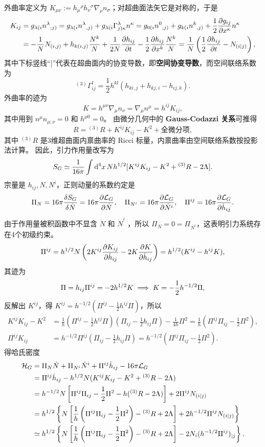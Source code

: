 外曲率定义为 $K_{\mu\nu}:=h_\mu{}^\rho h_\nu{}^\sigma\nabla_\rho n_\sigma$；对超曲面法矢它是对称的，于是
\begin{align*}
K_{ij} &= g_{\lambda(i}{n^{\lambda}}_{;j)} = g_{\lambda(i}{n^{\lambda}}_{,j)} + g_{\lambda(i}\Gamma_{j)\kappa}^{\lambda}n^{\kappa} = g_{0(i}{n^{0}}_{,j)} + g_{k(i}{n^{k}}_{,j)} + \frac{1}{2}\pdv{g_{ij}}{x^{\kappa}}n^{\kappa} \\
&= -\frac{1}{N}N_{(i,j)} + h_{k(i,j)}\frac{N^{k}}{N} + \frac{1}{2N}\pdv{h_{ij}}{t} - \frac{1}{2}\pdv{h_{ij}}{x^{k}}\frac{N^{k}}{N} = \frac{1}{N}\left(\frac{1}{2}\pdv{h_{ij}}{t} - N_{(i|j)}\right),
\end{align*}
其中下标竖线“|”代表在超曲面内的协变导数，即\textbf{空间协变导数}，而空间联络系数为
\[ ^{(3)}\Gamma_{ij}^{l} = \frac{1}{2}h^{kl}(h_{ki,j}+h_{kj,i}-h_{ij,k}). \]
外曲率的迹为
\[ K=h^{\mu\nu}\nabla_\mu n_\nu=\nabla_\mu n^\mu=h^{ij}K_{ij}, \]
其中用到 $n^{\mu}n_{\mu;\nu}=0$ 和 $h^{\mu0}=0$。
由微分几何中的 \textbf{Gauss-Codazzi 关系}可推得
\[ R = {}^{(3)}R + K^{ij}K_{ij} - K^{2} + \text{全微分项}, \]
其中 $^{(3)}R$ 是3维超曲面内禀曲率的 Ricci 标量，内禀曲率由空间联络系数按投影法计算。
因此，引力作用量改写为
\[ S_G \simeq \frac{1}{16\pi }\int \dd[4]{x}Nh^{1/2} [K^{ij}K_{ij}-K^{2}+{}^{(3)}R-2\Lambda]. \]
宗量是 $h_{ij},N,N^{i}$，正则动量的系数约定是
\[ \Pi_{N} = 16\pi \fdv{S_G}{\dot{N}} = 16\pi \pdv{\Lag_G}{\dot{N}},\quad\Pi_{N^{i}} = 16\pi \pdv{\Lag_G}{\dot{N}^{i}},\quad\Pi^{ij} = 16\pi \pdv{\Lag_G}{\dot{h}_{ij}}. \]
由于作用量被积函数中不显含 $\dot{N}$ 和 $\dot{N}^{i}$ ，所以 $\Pi_{N}=0=\Pi_{N^{i}}$，这表明引力系统存在4个初级约束。
\[ \Pi^{ij} = h^{1/2}N\left(2K^{ij}\pdv{K_{ij}}{\dot{h}_{ij}} - 2K\pdv{K}{\dot{h}_{ij}}\right) = h^{1/2}(K^{ij}-h^{ij}K), \]
其迹为
\[ \Pi = h_{ij}\Pi^{ij} = -2h^{1/2}K \implies K = -\frac{1}{2}h^{-1/2}\Pi, \]
反解出 $K^{ij}$，得 $K^{ij} = h^{-1/2}\left(\Pi^{ij}-\frac{1}{2}h^{ij}\Pi\right)$，所以
\begin{align}
    \label{eq:KK-K^2}
    K^{ij}K_{ij}-K^{2} &= \frac{1}{h}\left(\Pi^{ij}-\frac{1}{2}h^{ij}\Pi\right)\left(\Pi_{ij}-\frac{1}{2}h_{ij}\Pi\right) - \frac{1}{4h}\Pi^{2} = \frac{1}{h}\left(\Pi^{ij}\Pi_{ij}-\frac{1}{2}\Pi^{2}\right),\\
    \Pi^{ij}K_{ij} &= h^{-1/2}\Pi^{ij}\left(\Pi_{ij}-\frac{1}{2}h_{ij}\Pi\right) = h^{-1/2}\left(\Pi^{ij}\Pi_{ij}-\frac{1}{2}\Pi^{2}\right).
\end{align}
得哈氏密度
\begin{align*}
\mathcal{H}_G &= \Pi_{N}\dot{N}+\Pi_{N^{i}}\dot{N}^{i}+\Pi^{ij}\dot{h}_{ij}-16\pi \mathcal{L}_G \\
&= \Pi^{ij}\dot{h}_{ij}-h^{1/2}N(K^{ij}K_{ij}-K^{2}+{}^{(3)}R-2\Lambda) \\
&= h^{-1/2}N\left[\Pi^{ij}\Pi_{ij}-\frac{1}{2}\Pi^{2}-h({}^{(3)}R-2\Lambda)\right]+2\Pi^{ij}N_{(i|j)} \\
&= h^{1/2}\left\{N\left[\frac{1}{h}\left(\Pi^{ij}\Pi_{ij}-\frac{1}{2}\Pi^{2}\right)-{}^{(3)}R+2\Lambda\right]+2h^{-1/2}\Pi^{ij}N_{(i|j)}\right\} \\
&\simeq h^{1/2}\left\{N\left[\frac{1}{h}\left(\Pi^{ij}\Pi_{ij}-\frac{1}{2}\Pi^{2}\right)-{}^{(3)}R+2\Lambda\right]-2N_i(h^{-1/2}\Pi^{ij})_{|j}\right\}.
\end{align*}
